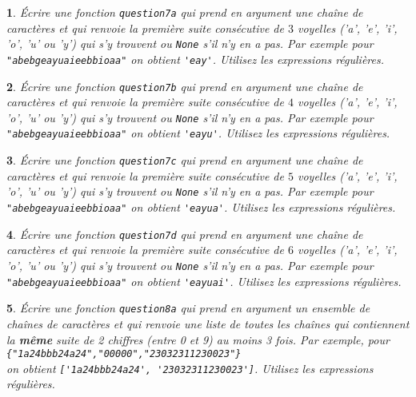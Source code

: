 \documentclass[10pt]{article}
\newtheorem{exi}{}
\newenvironment{exo}{\begin{exi}\em}{\end{exi}}
\begin{document}
\vspace*{-2ex}
\begin{exo}
    Écrire une fonction {\tt question7a}
qui prend en argument une chaîne de caractères et qui renvoie
la première suite consécutive de $3$ voyelles ('a', 'e', 'i', 'o', 'u' ou 'y')
qui s'y trouvent ou \verb+None+
s'il n'y en a pas.
Par exemple pour \verb+"abebgeayuaieebbioaa"+ on obtient
\verb+'eay'+. Utilisez les expressions régulières.
\end{exo}
\vspace*{-2ex}
\begin{exo}
    Écrire une fonction {\tt question7b}
qui prend en argument une chaîne de caractères et qui renvoie
la première suite consécutive de $4$ voyelles ('a', 'e', 'i', 'o', 'u' ou 'y')
qui s'y trouvent ou \verb+None+
s'il n'y en a pas.
Par exemple pour \verb+"abebgeayuaieebbioaa"+ on obtient
\verb+'eayu'+. Utilisez les expressions régulières.
\end{exo}
\vspace*{-2ex}
\begin{exo}
    Écrire une fonction {\tt question7c}
qui prend en argument une chaîne de caractères et qui renvoie
la première suite consécutive de $5$ voyelles ('a', 'e', 'i', 'o', 'u' ou 'y')
qui s'y trouvent ou \verb+None+
s'il n'y en a pas.
Par exemple pour \verb+"abebgeayuaieebbioaa"+ on obtient
\verb+'eayua'+. Utilisez les expressions régulières.
\end{exo}
\vspace*{-2ex}
\begin{exo}
    Écrire une fonction {\tt question7d}
qui prend en argument une chaîne de caractères et qui renvoie
la première suite consécutive de $6$ voyelles ('a', 'e', 'i', 'o', 'u' ou 'y')
qui s'y trouvent ou \verb+None+
s'il n'y en a pas.
Par exemple pour \verb+"abebgeayuaieebbioaa"+ on obtient
\verb+'eayuai'+. Utilisez les expressions régulières.
\end{exo}
\vspace*{-2ex}
\begin{exo}
    Écrire une fonction {\tt question8a} qui prend en argument un ensemble
de chaînes de caractères et qui renvoie une liste de toutes les chaînes
qui contiennent la {\bf même} suite de 2
chiffres (entre 0 et 9) au moins 3 fois.
Par exemple, pour \verb+{"1a24bbb24a24","00000","23032311230023"}+\\
on obtient \verb+['1a24bbb24a24', '23032311230023']+.
Utilisez les expressions régulières.
\end{exo}
\vspace*{-2ex}
\end{document}

